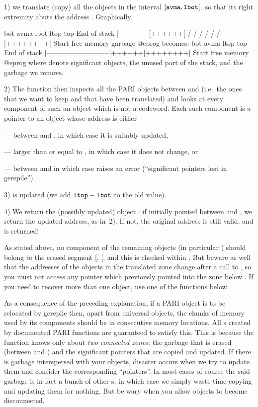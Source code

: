 1) we translate (copy) all the objects in the interval
$[{\tt avma}, {\tt lbot}[$, so that its right extremity abuts the address
. Graphically

\vbox{\bprog
             bot           avma   lbot          ltop     top
End of stack  |-------------[++++++[-/-/-/-/-/-/-|++++++++|  Start
                free memory            garbage
@eprog
\noindent becomes:
\bprog
             bot                         avma   ltop     top
End of stack  |---------------------------[++++++[++++++++|  Start
                       free memory
@eprog
}
\noindent where \kbd{++} denote significant objects, \kbd{--} the unused part
of the stack, and \kbd{-/-} the garbage we remove.

2) The function then inspects all the PARI objects between  and
 (i.e.~the ones that we want to keep and that have been translated)
and looks at every component of such an object which is not a codeword. Each
such component is a pointer to an object whose address is either

--- between  and , in which case it is suitably updated,

--- larger than or equal to , in which case it does not change, or

--- between  and  in which case 
raises an error (``significant pointers lost in gerepile'').

3)  is updated (we add ${\tt ltop} - {\tt lbot}$ to the old value).

4) We return the (possibly updated) object : if  initially
pointed between  and , we return the updated address, as
in~2). If not, the original address is still valid, and is returned!

As stated above, no component of the remaining objects (in particular
) should belong to the erased segment [, [, and
this is checked within . But beware as well that the addresses
of the objects in the translated zone change after a call to ,
so you must not access any pointer which previously pointed into the zone
below . If you need to recover more than one object, use one of the
 functions below.

As a consequence of the preceding explanation, if a PARI object is to be
relocated by \hbox{gerepile} then, apart from universal objects, the chunks
of memory used by its components should be in consecutive memory locations.
All s created by documented PARI functions are guaranteed to satisfy
this. This is because the  function knows only about \emph{two
connected zones}: the garbage that is erased (between  and
) and the significant pointers that are copied and updated. If
there is garbage interspersed with your objects, disaster occurs when we try
to update them and consider the corresponding ``pointers''. In most cases of
course the said garbage is in fact a bunch of other s, in which case
we simply waste time copying and updating them for nothing. But be wary when
you allow objects to become disconnected.

